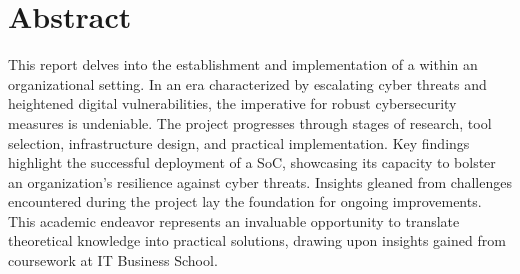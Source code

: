 \section*{Abstract}

This report delves into the establishment and implementation of a  within an organizational setting.
In an era characterized by escalating cyber threats and heightened digital vulnerabilities, the imperative for robust cybersecurity measures is undeniable. The project progresses through stages of research, tool selection, infrastructure design, and practical implementation.
Key findings highlight the successful deployment of a SoC, showcasing its capacity to bolster an organization's resilience against cyber threats.
Insights gleaned from challenges encountered during the project lay the foundation for ongoing improvements.
This academic endeavor represents an invaluable opportunity to translate theoretical knowledge into practical solutions, drawing upon insights gained from coursework at IT Business School.

\newpage
